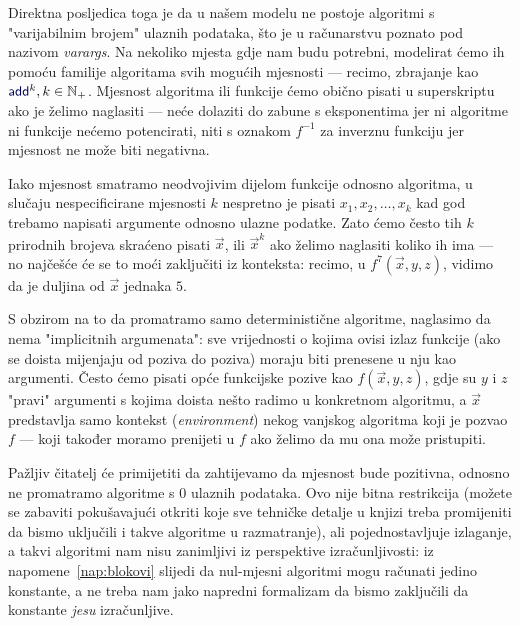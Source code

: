 Direktna posljedica toga je da u našem modelu ne postoje algoritmi s "varijabilnim brojem" ulaznih podataka, što je u računarstvu poznato pod nazivom \emph{varargs}. Na nekoliko mjesta gdje nam budu potrebni, modelirat ćemo ih pomoću familije algoritama svih mogućih mjesnosti --- recimo, zbrajanje kao $\f{add}^k,k\in\N_+$. Mjesnost algoritma ili funkcije ćemo obično pisati u superskriptu ako je želimo naglasiti --- neće dolaziti do zabune s eksponentima jer ni algoritme ni funkcije nećemo potencirati, niti s oznakom $f^{-1}$ za inverznu funkciju jer mjesnost ne može biti negativna.

Iako mjesnost smatramo neodvojivim dijelom funkcije odnosno algoritma, u slučaju nespecificirane mjesnosti $k$ nespretno je pisati $x_1,x_2,\dotsc,x_k$ kad god trebamo napisati argumente odnosno ulazne podatke. Zato ćemo često tih $k$ prirodnih brojeva skraćeno pisati $\vec x$, ili $\vec x^k$ ako želimo naglasiti koliko ih ima --- no najčešće će se to moći zaključiti iz konteksta: recimo, u $f^7(\vec x,y,z)$, vidimo da je duljina od $\vec x$ jednaka $5$.

\begin{napomena}[{name=[svi argumenti moraju biti eksplicitno navedeni]}]\label{nap:blokovi}
S obzirom na to da promatramo samo deterministične algoritme, naglasimo da nema "implicitnih argumenata": sve vrijednosti o kojima ovisi izlaz funkcije (ako se doista mijenjaju od poziva do poziva) moraju biti prenesene u nju kao argumenti. Često ćemo pisati opće funkcijske pozive kao $f(\vec x,y,z)$, gdje su $y$ i $z$ "pravi" argumenti s kojima doista nešto radimo u konkretnom algoritmu, a $\vec x$ predstavlja samo kontekst (\hspace{-1pt}\emph{environment}) nekog vanjskog algoritma koji je pozvao $f$ --- koji također moramo prenijeti u $f$ ako želimo da mu ona može pristupiti.
\end{napomena}

Pažljiv čitatelj će primijetiti da zahtijevamo da mjesnost bude pozitivna, odnosno ne promatramo algoritme s $0$ ulaznih podataka. Ovo nije bitna restrikcija (možete se zabaviti pokušavajući otkriti koje sve tehničke detalje u knjizi treba promijeniti da bismo uključili i takve algoritme u razmatranje), ali pojednostavljuje izlaganje, a takvi algoritmi nam nisu zanimljivi iz perspektive izračunljivosti: iz napomene~\ref{nap:blokovi} slijedi da nul-mjesni algoritmi mogu računati jedino konstante, a ne treba nam jako napredni formalizam da bismo zaključili da konstante \emph{jesu} izračunljive.

